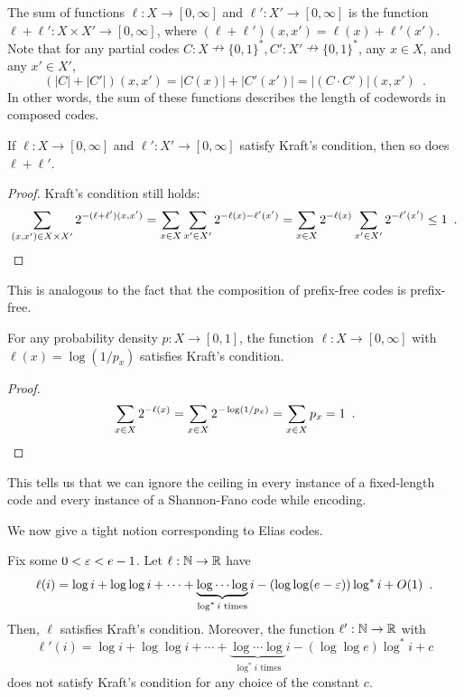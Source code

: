 \documentclass{patmorin}
\begin{document}
The sum of functions $\ell : X \to [0, \infty]$ and
$\ell' : X' \to [0, \infty]$ is the function
$\ell + \ell' : X \times X' \to [0, \infty]$, where
$(\ell + \ell') (x, x') = \ell(x) + \ell'(x')$. Note that for any
partial codes
$C : X \nrightarrow \{0, 1\}^*, C' : X' \nrightarrow \{0, 1\}^*$, any
$x \in X$, and any $x' \in X'$,
\[
(|C| + |C'|)(x, x') = |C(x)| + |C'(x')| = |(C \cdot C')|(x, x') \enspace .
\]
In other words, the sum of these functions describes the length of
codewords in composed codes.

\begin{lem}
  If $\ell : X \to [0, \infty]$ and $\ell' : X' \to [0,
  \infty]$ satisfy Kraft's condition, then so does $\ell + \ell'$.
\end{lem}
\begin{proof}
  Kraft's condition still holds:
  \[
  \sum_{(x, x') \in X \times X'} 2^{-(\ell + \ell')(x, x')} = \sum_{x
    \in X} \sum_{x' \in X'} 2^{-\ell(x) - \ell'(x')} = \sum_{x \in X}
  2^{-\ell(x)} \sum_{x' \in X'} 2^{-\ell'(x')} \leq 1 \enspace
  . \qedhere
  \]
\end{proof}
This is analogous to the fact that the composition of prefix-free
codes is prefix-free.

\begin{lem}
  For any probability density $p : X \to [0, 1]$, the function
  $\ell : X \to [0, \infty]$ with $\ell(x) = \log (1/p_x)$
  satisfies Kraft's condition.
\end{lem}
\begin{proof}
  \[
  \sum_{x \in X} 2^{-\ell(x)} = \sum_{x \in X} 2^{-\log (1/p_x)} =
  \sum_{x \in X} p_x = 1 \enspace . \qedhere
  \]
\end{proof}
This tells us that we can ignore the ceiling in every instance of a
fixed-length code and every instance of a Shannon-Fano code while
encoding.

We now give a tight notion corresponding to Elias codes.
\begin{thm}
  Fix some $0 < \varepsilon < e - 1$. Let $\ell : \mathbb{N} \to \mathbb{R}$ have
  \[
  \ell(i) = \log i + \log \log i + \cdots + \underbrace{\log \cdots
    \log}_{\text{$\log^* i$ times}} i - (\log \log (e - \varepsilon)) \log^*
  i + O(1) \enspace .
  \]
  Then, $\ell$ satisfies Kraft's condition. Moreover, the function
  $\ell' : \mathbb{N} \to \mathbb{R}$ with
  \[
  \ell'(i) = \log i + \log \log i + \cdots + \underbrace{\log \cdots
    \log}_{\text{$\log^* i$ times}} i - (\log \log e) \log^* i + c
  \]
  does not satisfy Kraft's condition for any choice of the constant
  $c$.
\end{thm}
\end{document}
